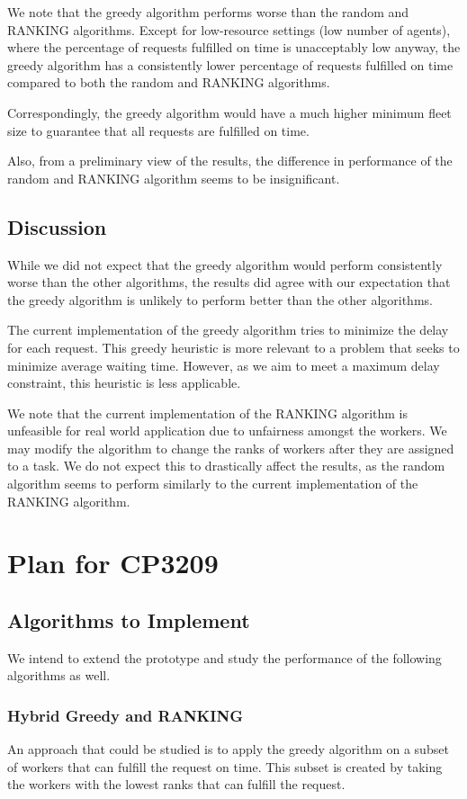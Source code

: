 \documentclass[urop]{nurop}
\begin{document}
We note that the greedy algorithm performs worse than the random and RANKING algorithms. Except for low-resource settings (low number of agents), where the percentage of requests fulfilled on time is unacceptably low anyway, the greedy algorithm has a consistently lower percentage of requests fulfilled on time compared to both the random and RANKING algorithms.

Correspondingly, the greedy algorithm would have a much higher minimum fleet size to guarantee that all requests are fulfilled on time. 

Also, from a preliminary view of the results, the difference in performance of the random and RANKING algorithm seems to be insignificant.

\subsection{Discussion}
While we did not expect that the greedy algorithm would perform consistently worse than the other algorithms, the results did agree with our expectation that the greedy algorithm is unlikely to perform better than the other algorithms.

The current implementation of the greedy algorithm tries to minimize the delay for each request. This greedy heuristic is more relevant to a problem that seeks to minimize average waiting time. However, as we aim to meet a maximum delay constraint, this heuristic is less applicable.

We note that the current implementation of the RANKING algorithm is unfeasible for real world application due to unfairness amongst the workers. We may modify the algorithm to change the ranks of workers after they are assigned to a task. We do not expect this to drastically affect the results, as the random algorithm seems to perform similarly to the current implementation of the RANKING algorithm.

\section{Plan for CP3209}
\label{sec:plan}
\subsection{Algorithms to Implement}
We intend to extend the prototype and study the performance of the following algorithms as well.

\subsubsection{Hybrid Greedy and RANKING}
An approach that could be studied is to apply the greedy algorithm on a subset of workers that can fulfill the request on time. This subset is created by taking the workers with the lowest ranks that can fulfill the request.
\end{document}
